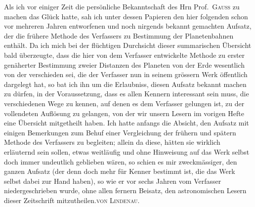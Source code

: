 \expandafter\def\csname HistoricalNoteText8\endcsname{Als ich vor einiger Zeit die persönliche Bekanntschaft des Hrn Prof.\ \textsc{Gauss} zu machen das Glück hatte, sah ich unter dessen Papieren den hier folgenden schon vor mehreren Jahren entworfenen und noch nirgends bekannt gemachten Aufsatz, der die frühere Methode des Verfassers zu Bestimmung der Planetenbahnen enthält. Da ich mich bei der flüchtigen Durchsicht dieser summarischen Übersicht bald überzeugte, dass die hier von dem Verfasser entwickelte Methode zu erster genäherter Bestimmung zweier Distanzen des Planeten von der Erde wesentlich von der verschieden sei, die der Verfasser nun in seinem grössern Werk öffentlich dargelegt hat, so bat ich ihn um die Erlaubniss, diesen Aufsatz bekannt machen zu dürfen, in der Voraussetzung, dass es allen Kennern interessant sein muss, die verschiedenen Wege zu kennen, auf denen es dem Verfasser gelungen ist, zu der vollendeten Auflösung zu gelangen, von der wir unsern Lesern im vorigen Hefte eine Übersicht mitgetheilt haben. Ich hatte anfangs die Absicht, den Aufsatz mit einigen Bemerkungen zum Behuf einer Vergleichung der frühern und spätern Methode des Verfassers zu begleiten; allein da diese, hätten sie wirklich erläuternd sein sollen, etwas weitläufig und ohne Hinweisung auf das Werk selbst doch immer undeutlich geblieben wären, so schien es mir zweckmässiger, den ganzen Aufsatz (der denn doch mehr für Kenner bestimmt ist, die das Werk selbst dabei zur Hand haben), so wie er vor sechs Jahren vom Verfasser niedergeschrieben wurde, ohne allen fernern Beisatz, den astronomischen Lesern dieser Zeitschrift mitzutheilen.\hfill\textsc{von Lindenau.}}
\clearpage
\thispagestyle{empty}
\noindent{}%
\par\vspace*{\baselineskip}
